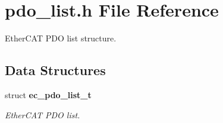 \section{pdo\-\_\-list.\-h File Reference}
\label{pdo__list_8h}


Ether\-C\-A\-T P\-D\-O list structure.  


\subsection*{Data Structures}
\begin{DoxyCompactItemize}
\item 
struct {\bf ec\-\_\-pdo\-\_\-list\-\_\-t}
\begin{DoxyCompactList}\small\item\em Ether\-C\-A\-T P\-D\-O list. \end{DoxyCompactList}\end{DoxyCompactItemize}
